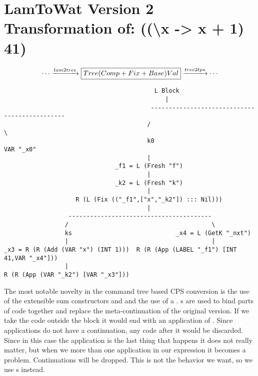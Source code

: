\section{\label{section:v2printsimple}LamToWat Version 2 Transformation of: ((\textbackslash x -> x + 1) 41)}
\begin{landscape}
\begin{gather*}
  \cdots \xrightarrow{lam2tree} \boxed{Tree  (Comp + Fix + Base) Val} \xrightarrow{tree2tps} \cdots
\end{gather*}
\begin{lstlisting}
                                          L Block                                           
                                             |                                              
                                         ----------------------------------------------     
                                        /                                              \    
                                        k0                                         VAR "_x0"
                                        |                                                   
                               _f1 = L (Fresh "f")                                          
                                        |                                                   
                               _k2 = L (Fresh "k")                                          
                                        |                                                   
                    R (L (Fix (("_f1",["x","_k2"]) ::: Nil)))                               
                                        |                                                   
                  ----------------------------------------                                  
                 /                                        \                                 
                 ks                             _x4 = L (GetK "_nxt")                       
                 |                                        |                                 
_x3 = R (R (Add (VAR "x") (INT 1)))  R (R (App (LABEL "_f1") [INT 41,VAR "_x4"]))           
                 |                                                                          
R (R (App (VAR "_k2") [VAR "_x3"]))                                                         

\end{lstlisting}
The most notable novelty in the command tree based CPS conversion is the use of the extensible sum constructors  and  and the use of a . s are used to bind parts of code together and replace the meta-continuation of the original version. If we take the code outside the block it would end with an application of . Since applications do not have a continuation, any code after it would be discarded. Since in this case the application is the last thing that happens it does not really matter, but when we more than one application in our expression it becomes a problem. Continuations will be dropped. This is not the behavior we want, so we use s instead.
\end{landscape}
\clearpage


